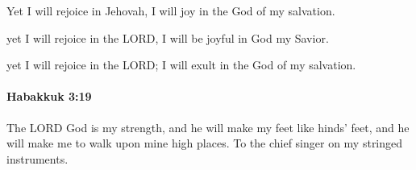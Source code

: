 			\begin{versebox}
					\item[BHS] 
					\item[LXX] 
					\item[ASV] Yet I will rejoice in Jehovah, I will joy in the God of my salvation.
					\item[NIV] yet I will rejoice in the LORD, I will be joyful in God my Savior.
					\item[NRSV] yet I will rejoice in the LORD; I will exult in the God of my salvation.
			\end{versebox}

		\paragraph{Habakkuk 3:19} %
			\label{HABAKKUK-3-19}

			The LORD God is my strength, and he will make my feet like hinds’ feet, and he will make me to walk upon mine high places. To the chief singer on my stringed instruments.

